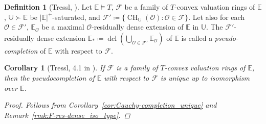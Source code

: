 \documentclass{amsart}
\newtheorem{corollary}[theorem]{Corollary}
\theoremstyle{remark}
\theoremstyle{definition}
\newtheorem{definition}[theorem]{Definition}
\theoremstyle{plain}
\newcommand{\bE}{\mathbb E}
\newcommand{\bU}{\mathbb U}
\newcommand{\cF}{\mathcal F}
\newcommand{\cO}{\mathcal O}
\DeclareMathOperator{\dcl}{\mathrm{dcl}}
\DeclareMathOperator{\CH}{\mathrm{CH}}
\theoremstyle{plain}
\begin{document}
\begin{definition}[Tressl, \cite{tressl2006pseudo}]
    Let $\bE \models T$, $\cF$ be a family of $T$-convex valuation rings of $\bE$, $\bU \succ \bE$ be $|\bE|^+$-saturated, and $\cF'\coloneqq \{\CH_\bU(\cO): \cO \in \cF\}$. Let also for each $\cO\in\cF'$, $\bE_\cO$ be a maximal $\cO$-residually dense extension of $\bE$ in $\bU$.
    The $\cF'$-residually dense extension $\bE_*\coloneqq \dcl(\bigcup_{\cO \in \cF'} \bE_\cO)$ of $\bE$ is called a \emph{pseudo-completion} of $\bE$ with respect to $\cF$.
\end{definition}

\begin{corollary}[Tressl, 4.1 in \cite{tressl2006pseudo}]
    If $\cF$ is a family of $T$-convex valuation rings of $\bE$, then the pseudocompletion of $\bE$ with respect to $\cF$ is unique up to isomorphism over $\bE$.
    \begin{proof}
        Follows from Corollary~\ref{cor:Cauchy-completion_unique} and Remark~\ref{rmk:F-res-dense_iso_type}.
    \end{proof}
\end{corollary}
\end{document}
